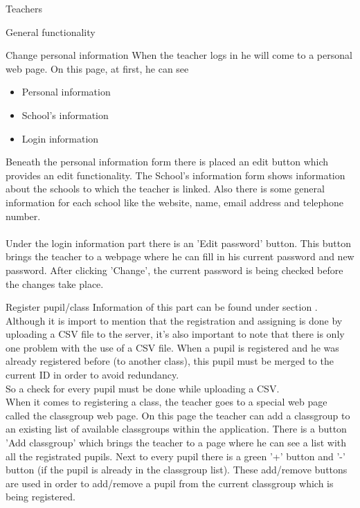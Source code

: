 \begin{section}{Teachers}
\begin{subsection}{General functionality}
    \begin{subsubsection}{Change personal information}
	When the teacher logs in he will come to a personal web page. On this page, at first, he can see
	\begin{itemize}
		\item Personal information
		\item School's information
		\item Login information
	\end{itemize}	
	Beneath the personal information form there is placed an edit button which provides an edit functionality.
	The School's information form shows information about the schools to which the teacher is linked. Also there is some general
	information for each school like the website, name, email address and telephone number.\\
	\\
	Under the login information part there is an 'Edit password' button. 
	This button brings the teacher to a webpage where he can fill in his current password and new password. 
	After clicking 'Change', the current password is being checked before the changes take place.
	\end{subsubsection}
	\begin{subsubsection}{Register pupil/class}
	Information of this part can be found under section .\\
	Although it is import to mention that the registration and assigning is done by uploading a CSV file to the server, it's also important to note that there is only one problem with the use of a CSV file. When a pupil is registered and he	was already registered before (to another class), this pupil must be merged to the current ID in order to avoid
	redundancy.\\
	So a check for every pupil must be done while uploading a CSV. \\
	When it comes to registering a class, the teacher goes to a special web page called the classgroup web page. On this page
	the teacher can add a classgroup to an existing list of available classgroups within the application. There is a button
	'Add classgroup' which brings the teacher to a page where he can see a list with all the registrated pupils. Next to every
	pupil there is a green '+' button and '-' button (if the pupil is already in the classgroup list). These add/remove buttons
	are used in order to add/remove a pupil from the current classgroup which is being registered.\\

\end{subsubsection}
\end{subsection}
\end{section}
